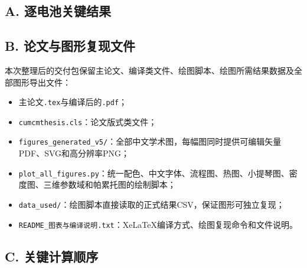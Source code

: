 \documentclass[withoutpreface]{cumcmthesis}
\begin{document}
\subsection*{A. 逐电池关键结果}



\subsection*{B. 论文与图形复现文件}

本次整理后的交付包保留主论文、编译类文件、绘图脚本、绘图所需结果数据及全部图形导出文件：
\begin{itemize}
  \item 主论文\texttt{.tex}与编译后的\texttt{.pdf}；
  \item \texttt{cumcmthesis.cls}：论文版式类文件；
  \item \texttt{figures\_generated\_v5/}：全部中文学术图，每幅图同时提供可编辑矢量PDF、SVG和高分辨率PNG；
  \item \texttt{plot\_all\_figures.py}：统一配色、中文字体、流程图、热图、小提琴图、密度图、三维参数域和帕累托图的绘制脚本；
  \item \texttt{data\_used/}：绘图脚本直接读取的正式结果CSV，保证图形可独立复现；
  \item \texttt{README\_图表与编译说明.txt}：XeLaTeX编译方式、绘图复现命令和文件说明。
\end{itemize}

\subsection*{C. 关键计算顺序}
\end{document}
